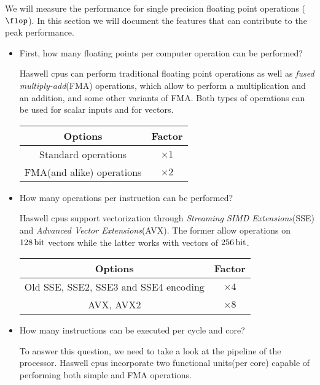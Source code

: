 \documentclass[
    12pt, %
]{fphw}
\begin{document}
    We will measure the performance for single precision floating point operations
($\si{\flop}$).
In this section we will document the features that can contribute to
the peak performance.

\begin{itemize}
    \item First, how many floating points per computer operation can be performed?

    Haswell cpus can perform traditional floating point operations as well as
    \textit{fused multiply-add}(FMA) operations,
    which allow to perform a multiplication and an addition,
    and some other variants of FMA. %
    Both types of operations can be used for scalar inputs and for vectors.

    \begin{center}
    \begin{tabular}{c|c}
        \textbf{Options} & \textbf{Factor} \\
        \hline \hline
        Standard operations & $\times 1$ \\
        FMA(and alike) operations & $\times 2$ \\
    \end{tabular}
    \end{center}

    \item How many operations per instruction can be performed?

    Haswell cpus support vectorization through \textit{Streaming SIMD Extensions}(SSE)
    and \textit{Advanced Vector Extensions}(AVX).
    The former allow operations on $\SI{128}{\bit}$ vectors while the latter
    works with vectors of $\SI{256}{\bit}$.
    
    \begin{center}
    \begin{tabular}{c|c}
        \textbf{Options} & \textbf{Factor} \\
        \hline \hline
        Old SSE, SSE2, SSE3 and SSE4 encoding & $\times 4$ \\ %
        AVX, AVX2 & $\times 8$ \\
    \end{tabular}
    \end{center}

    \item How many instructions can be executed per cycle and core?

    To answer this question, we need to take a look at the pipeline of the processor.
    Haswell cpus incorporate two functional units(per core) capable of performing
    both simple and FMA operations.


\end{itemize}
\end{document}

